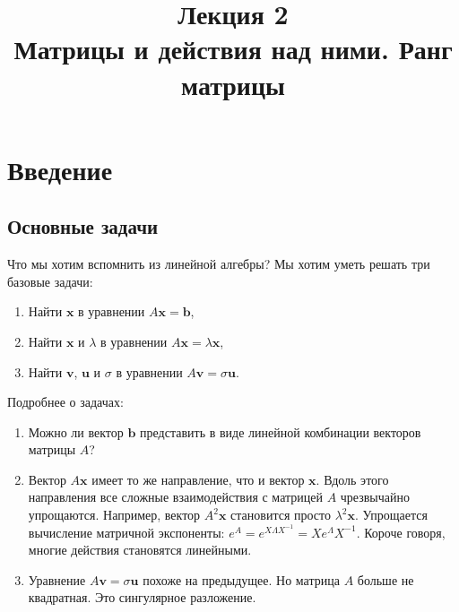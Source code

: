 \documentclass[11pt,a4paper]{article}
\title{
      {\Large Лекция 2} \\
      Матрицы и действия над ними. Ранг матрицы
    }
\date{}
\providecommand{\tightlist}{%
      \setlength{\itemsep}{0pt}\setlength{\parskip}{0pt}}
\begin{document}
  \maketitle
  \thispagestyle{empty}
  \tableofcontents

  \newpage


\hypertarget{ux432ux432ux435ux434ux435ux43dux438ux435}{%
\section{Введение}\label{ux432ux432ux435ux434ux435ux43dux438ux435}}

\hypertarget{ux43eux441ux43dux43eux432ux43dux44bux435-ux437ux430ux434ux430ux447ux438}{%
\subsection{Основные
задачи}\label{ux43eux441ux43dux43eux432ux43dux44bux435-ux437ux430ux434ux430ux447ux438}}

Что мы хотим вспомнить из линейной алгебры? Мы хотим уметь решать три базовые задачи:

\begin{enumerate}
\def\labelenumi{\arabic{enumi}.}
\tightlist
\item
  Найти \(\mathbf{x}\) в уравнении \(A\mathbf{x} = \mathbf{b}\),
\item
  Найти \(\mathbf{x}\) и \(\lambda\) в уравнении
  \(A\mathbf{x} = \lambda \mathbf{x}\),
\item
  Найти \(\mathbf{v}\), \(\mathbf{u}\) и \(\sigma\) в уравнении
  \(A\mathbf{v} = \sigma \mathbf{u}\).
\end{enumerate}

Подробнее о задачах:
\begin{enumerate}
\item
  Можно ли вектор \(\mathbf{b}\) представить в виде линейной комбинации
  векторов матрицы \(A\)?
\item
  Вектор \(A\mathbf{x}\) имеет то же направление, что и вектор
  \(\mathbf{x}\). Вдоль этого направления все сложные взаимодействия с
  матрицей \(A\) чрезвычайно упрощаются. Например, вектор
  \(A^2 \mathbf{x}\) становится просто \(\lambda^2 \mathbf{x}\).
  Упрощается вычисление матричной экспоненты:
  \(e^{A} = e^{X \Lambda X^{-1}} = X e^{\Lambda} X^{-1}\). Короче
  говоря, многие действия становятся линейными.
\item
  Уравнение \(A\mathbf{v} = \sigma \mathbf{u}\) похоже на предыдущее. Но
  матрица \(A\) больше не квадратная. Это сингулярное разложение.
\end{enumerate}
\end{document}

